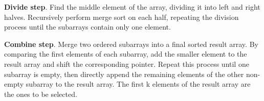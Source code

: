 \noindent \textbf{Divide step}.
Find the middle element of the array, dividing it into left and right halves. Recursively perform merge sort on each half, repeating the division process until the subarrays contain only one element.

\noindent \textbf{Combine step}.
Merge two ordered subarrays into a final sorted result array. By comparing the first elements of each subarray, add the smaller element to the result array and shift the corresponding pointer. Repeat this process until one subarray is empty, then directly append the remaining elements of the other non-empty subarray to the result array.
The first k elements of the result array are the ones to be selected.

\newpage